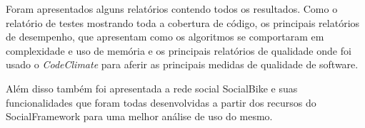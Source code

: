 Foram apresentados alguns relatórios contendo todos os resultados. Como o relatório de testes mostrando toda a cobertura de código, os principais relatórios de desempenho, que apresentam como os algoritmos se comportaram em complexidade e uso de memória e os principais relatórios de qualidade onde foi usado o \textit{CodeClimate} para aferir as principais medidas de qualidade de software.

Além disso também foi apresentada a rede social SocialBike e suas funcionalidades que foram todas desenvolvidas a partir dos recursos do SocialFramework para uma melhor análise de uso do mesmo.

